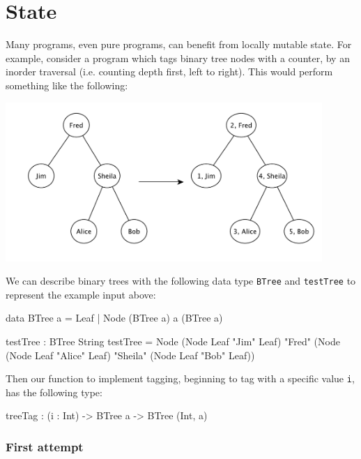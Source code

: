 \section{State}

\label{sect:state}

Many programs, even pure programs, can benefit from locally mutable state.
For example, consider a program which tags binary tree nodes with a counter,
by an inorder traversal (i.e. counting depth first, left to right). This
would perform something like the following:

\begin{center}
\includegraphics[width=12cm]{content/treelabel.pdf}
\end{center}

\noindent
We can describe binary trees with the following data type \texttt{BTree}
and \texttt{testTree} to represent the example input above:

\begin{code}
data BTree a = Leaf
             | Node (BTree a) a (BTree a)

testTree : BTree String
testTree = Node (Node Leaf "Jim" Leaf)
                "Fred"
                (Node (Node Leaf "Alice" Leaf)
                      "Sheila"
                      (Node Leaf "Bob" Leaf))
\end{code}

\noindent
Then our function to implement tagging, beginning to tag with a specific
value \texttt{i}, has the following type:

\begin{code}
treeTag : (i : Int) -> BTree a -> BTree (Int, a)
\end{code}

\subsubsection*{First attempt}

